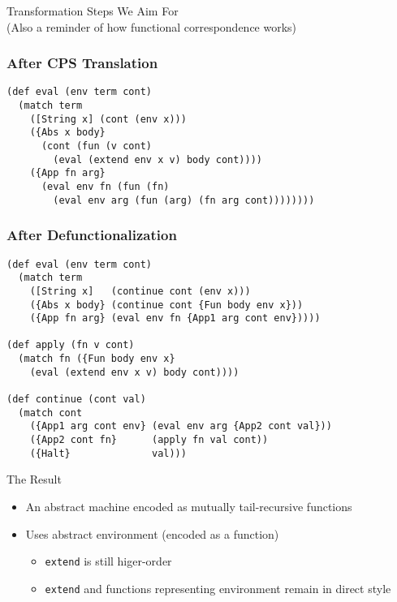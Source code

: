 \documentclass{beamer}
\begin{document}
\begin{frame}
  \begin{center}
    \LARGE{Transformation Steps We Aim For}\\
    \tiny{(Also a reminder of how functional correspondence works)}
  \end{center}
\end{frame}

\begin{frame}[fragile]
  \frametitle{After CPS Translation}
  \begin{lstlisting}
(def eval (env term cont)
  (match term
    ([String x] (cont (env x)))
    ({Abs x body}
      (cont (fun (v cont)
        (eval (extend env x v) body cont))))
    ({App fn arg}
      (eval env fn (fun (fn)
        (eval env arg (fun (arg) (fn arg cont))))))))
  \end{lstlisting}
\end{frame}

\begin{frame}[fragile]
  \frametitle{After Defunctionalization}
  \begin{lstlisting}
(def eval (env term cont)
  (match term
    ([String x]   (continue cont (env x)))
    ({Abs x body} (continue cont {Fun body env x}))
    ({App fn arg} (eval env fn {App1 arg cont env}))))

(def apply (fn v cont)
  (match fn ({Fun body env x}
    (eval (extend env x v) body cont))))

(def continue (cont val)
  (match cont
    ({App1 arg cont env} (eval env arg {App2 cont val}))
    ({App2 cont fn}      (apply fn val cont))
    ({Halt}              val)))
  \end{lstlisting}
\end{frame}

\begin{frame}{The Result}
  \begin{itemize}
    \item An abstract machine encoded as mutually tail-recursive functions
    \item Uses abstract environment (encoded as a function)
    \begin{itemize}
      \item \lstinline{extend} is still higer-order
      \item \lstinline{extend} and functions representing environment remain in direct style
    \end{itemize}
  \end{itemize}
\end{frame}
\end{document}
